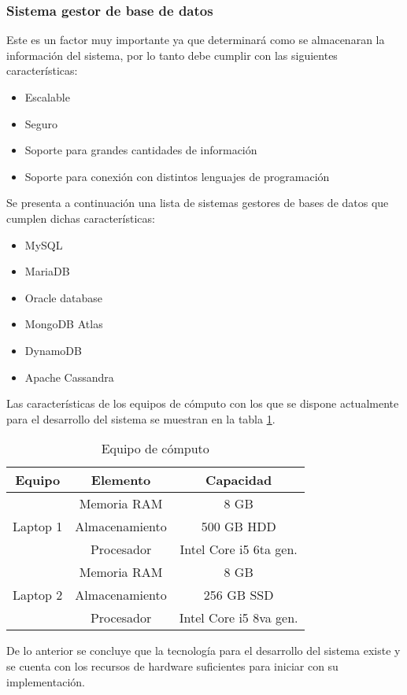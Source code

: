 \subsubsection{Sistema gestor de base de datos}

Este es un factor muy importante ya que determinará como se almacenaran la información del sistema, por lo tanto debe cumplir con las siguientes características:

\begin{itemize}
    \item Escalable
    \item Seguro
    \item Soporte para grandes cantidades de información
    \item Soporte para conexión con distintos lenguajes de programación
\end{itemize}


Se presenta a continuación una lista de sistemas gestores de bases de datos que cumplen dichas características:

\begin{itemize}
    \item MySQL
    \item MariaDB
    \item Oracle database
    \item MongoDB Atlas
    \item DynamoDB
    \item Apache Cassandra
\end{itemize}

Las características de los equipos de cómputo con los que se dispone actualmente para el desarrollo del sistema se muestran en la tabla \ref{tab:hw_devices}.

\begin{table}
    \begin{tabular}{|c|c|c|}
        \hline
        Equipo & Elemento & Capacidad \\ \hline
        \multirow{3}{*}{Laptop 1} & Memoria RAM & 8 GB \\
        & Almacenamiento & 500 GB HDD \\
        & Procesador & Intel Core i5 6ta gen. \\ \hline
        \multirow{3}{*}{Laptop 2} & Memoria RAM & 8 GB \\
        & Almacenamiento & 256 GB SSD \\
        & Procesador & Intel Core i5 8va gen.\\ \hline
    \end{tabular}
    \caption{Equipo de cómputo}
    \label{tab:hw_devices}
\end{table}


De lo anterior se concluye que la tecnología para el desarrollo del sistema existe y se cuenta con los recursos de hardware suficientes para iniciar con su implementación.